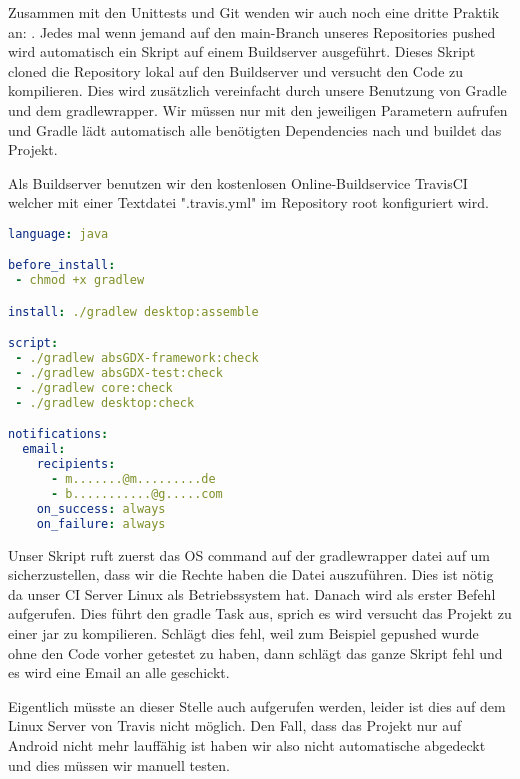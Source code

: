 Zusammen mit den Unittests und Git wenden wir auch noch eine dritte Praktik an: .
Jedes mal wenn jemand auf den main-Branch unseres Repositories pushed wird automatisch ein Skript auf einem Buildserver ausgeführt.
Dieses Skript cloned die Repository lokal auf den Buildserver und versucht den Code zu kompilieren. Dies wird zusätzlich vereinfacht durch unsere Benutzung von Gradle und dem gradlewrapper. Wir müssen nur  mit den jeweiligen Parametern aufrufen und Gradle lädt automatisch alle benötigten Dependencies nach und buildet das Projekt.

Als Buildserver benutzen wir den kostenlosen Online-Buildservice TravisCI  welcher mit einer Textdatei ".travis.yml" im Repository root konfiguriert wird.

\begin{lstlisting}[caption=TravisCI Konfiguration, title=\hspace{0 pt}, language=yaml]
language: java

before_install:
 - chmod +x gradlew

install: ./gradlew desktop:assemble

script: 
 - ./gradlew absGDX-framework:check
 - ./gradlew absGDX-test:check
 - ./gradlew core:check
 - ./gradlew desktop:check

notifications:
  email:
    recipients:
      - m.......@m.........de
      - b...........@g.....com
    on_success: always
    on_failure: always
\end{lstlisting}

Unser Skript ruft zuerst das OS command  auf der gradlewrapper datei auf um sicherzustellen, dass wir die Rechte haben die Datei auszuführen. Dies ist nötig da unser CI Server Linux als Betriebssystem hat.
Danach wird als erster Befehl  aufgerufen. Dies führt den gradle Task  aus, sprich es wird versucht das Projekt zu einer jar zu kompilieren. Schlägt dies fehl, weil zum Beispiel gepushed wurde ohne den Code vorher getestet zu haben, dann schlägt das ganze Skript fehl und es wird eine Email an alle  geschickt.

Eigentlich müsste an dieser Stelle auch  aufgerufen werden, leider ist dies auf dem Linux Server von Travis nicht möglich. Den Fall, dass das Projekt nur auf Android nicht mehr lauffähig ist haben wir also nicht automatische abgedeckt und dies müssen wir manuell testen.

